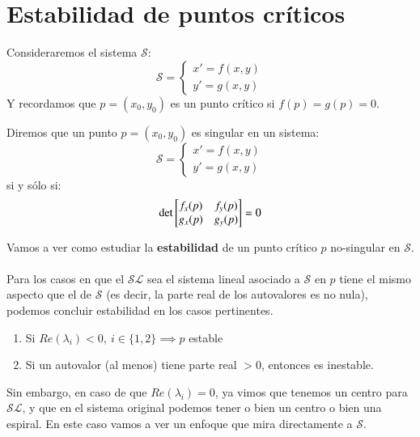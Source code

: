 \section{Estabilidad de puntos críticos}
Consideraremos el sistema $\mathcal{S}$:
$$
    \mathcal{S} =
    \begin{cases}
        x' = f(x, y)\\
        y' = g(x, y)
    \end{cases}
$$
Y recordamos que $p = (x_0, y_0)$ es un punto crítico si $f(p) = g(p) = 0$.
\begin{dfn}
    Diremos que un punto $p = (x_0, y_0)$ es singular en un sistema:
    $$
    \mathcal{S} =
    \begin{cases}
        x' = f(x, y)\\
        y' = g(x, y)
    \end{cases}
    $$ si y sólo si:
    $$
        \det \mx{f_x(p) & f_y(p)\\ g_x(p) & g_y(p)} = 0
    $$
\end{dfn}
Vamos a ver como estudiar la \textbf{estabilidad} de un punto crítico $p$ no-singular en $\mathcal{S}$.\\\\
Para los casos en que el $\mathcal{SL}$ sea el  sistema lineal asociado a $\mathcal{S}$ en $p$ tiene el mismo aspecto que el de $\mathcal{S}$ (es decir, la parte real de los autovalores es no nula), podemos concluir estabilidad en los casos pertinentes.
\begin{enumerate}
    \item Si $Re(\lambda_i) < 0,\ i\in\{1, 2\} \implies p$ estable
    \item Si un autovalor (al menos) tiene parte real $ > 0$, entonces es inestable.
\end{enumerate}
Sin embargo, en caso de que $Re(\lambda_i) = 0$, ya vimos que tenemos un centro para $\mathcal{SL}$, y que en el sistema original podemos tener o bien un centro o bien una espiral. En este caso vamos a ver un enfoque que mira directamente a $\mathcal{S}$.\\\\


